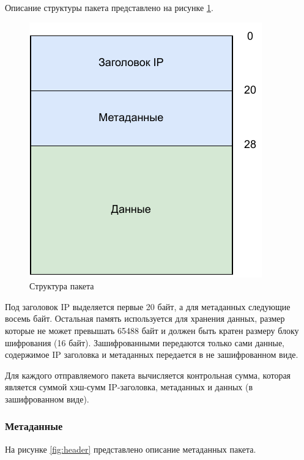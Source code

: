 Описание структуры пакета представлено на рисунке \ref{fig:packet}.

\begin{figure}[H]
	\centering
	\includegraphics[width=\textwidth]{img/packet.pdf}
	\caption{Структура пакета}
	\label{fig:packet}
\end{figure}

Под заголовок IP выделяется первые 20 байт, а для метаданных следующие восемь байт. Остальная память используется для хранения данных, размер которые не может превышать 65488 байт и должен быть кратен размеру блоку шифрования (16 байт). Зашифрованными передаются только сами данные, содержимое IP заголовка и метаданных передается в не зашифрованном виде.

Для каждого отправляемого пакета вычисляется контрольная сумма, которая является суммой хэш-сумм IP-заголовка, метаданных и данных (в зашифрованном виде).

\subsubsection{Метаданные}

На рисунке \ref{fig:header} представлено описание метаданных пакета.

